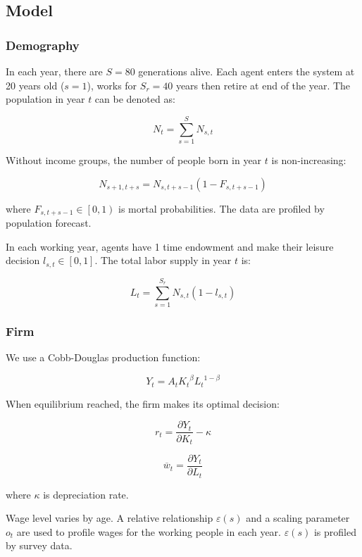 \hypertarget{model}{%
\subsection{Model}\label{model}}

\hypertarget{demography}{%
\subsubsection{Demography}\label{demography}}

In each year, there are \(S = 80\) generations alive. Each agent enters
the system at 20 years old (\(s = 1\)), works for \(S_{r} = 40\) years
then retire at end of the year. The population in year \(t\) can be
denoted as:

\[N_{t} = \sum_{s = 1}^{S}N_{s,t}\]

Without income groups, the number of people born in year \(t\) is
non-increasing:

\[N_{s + 1,t + s} = N_{s,t + s - 1}\left( 1 - F_{s,t + s - 1} \right)\]

where \(F_{s,t + s - 1} \in \left\lbrack 0,1 \right)\) is mortal
probabilities. The data are profiled by population forecast.

In each working year, agents have 1 time endowment and make their
leisure decision \(l_{s,t} \in \left\lbrack 0,1 \right\rbrack\). The
total labor supply in year \(t\) is:

\[L_{t} = \sum_{s = 1}^{S_{r}}{N_{s,t}\left( 1 - l_{s,t} \right)}\]

\hypertarget{firm}{%
\subsubsection{Firm}\label{firm}}

We use a Cobb-Douglas production function:

\[Y_{t} = A_{t}{K_{t}}^{\beta}{L_{t}}^{1 - \beta}\]

When equilibrium reached, the firm makes its optimal decision:

\[r_{t} = \frac{\partial Y_{t}}{\partial K_{t}} - \kappa\]

\[{\overline{w}}_{t} = \frac{\partial Y_{t}}{\partial L_{t}}\]

where \(\kappa\) is depreciation rate.

Wage level varies by age. A relative relationship
\(\varepsilon\left( s \right)\) and a scaling parameter \(o_{t}\) are
used to profile wages for the working people in each year.
\(\varepsilon\left( s \right)\) is profiled by survey data.

